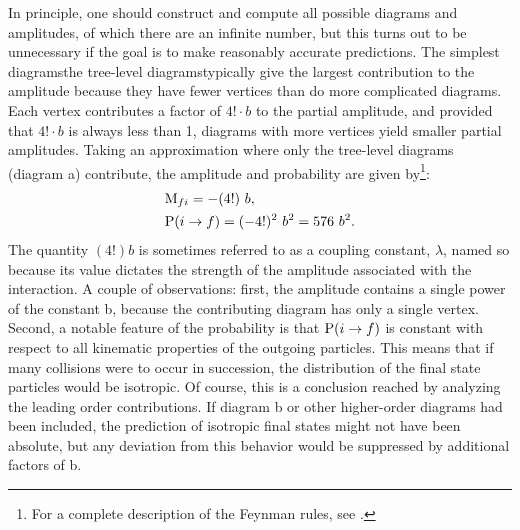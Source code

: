 In principle, one should construct and compute all possible diagrams and amplitudes, of which there are an infinite number, but this turns out to be unnecessary if the goal is to make reasonably accurate predictions. The simplest diagrams\textemdash the tree-level diagrams\textemdash typically give the largest contribution to the amplitude because they have fewer vertices than do more complicated diagrams. Each vertex contributes a factor of $4!\cdot b$ to the partial amplitude, and provided that $4!\cdot b$ is always less than 1,  diagrams with more vertices yield smaller partial amplitudes. Taking an approximation where only the tree-level diagrams (diagram a) contribute, the amplitude and probability are given by\footnote{For a complete description of the Feynman rules, see \cite{Peskin:1995ev}.}:
\begin{align}
&{\rm M}_{fi}=-(4!)\ b,\\
&{\rm P}(i\rightarrow f) = (-4!)^2\ b^2 = 576\ b^2.
\end{align}
The quantity $(4!)b$ is sometimes referred to as a coupling constant, $\lambda$, named so because its value dictates the strength of the amplitude associated with the interaction. A couple of observations: first, the amplitude contains a single power of the constant b, because the contributing diagram has only a single vertex. Second, a notable feature of the probability is that ${\rm P}(i\rightarrow f)$ is constant with respect to all kinematic properties of the outgoing particles. This means that if many collisions were to occur in succession, the distribution of the final state particles would be isotropic. Of course, this is a conclusion reached by analyzing the leading order contributions. If diagram b or other higher-order diagrams had been included, the prediction of isotropic final states might not have been absolute, but any deviation from this behavior would be suppressed by additional factors of b. 

